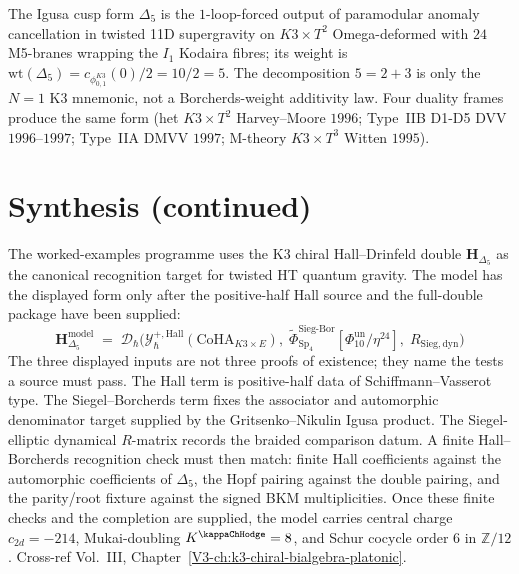 \begin{remark}
\label{rem:ex-delta5-1loop}
The Igusa cusp form $\Delta_5$ is the $1$-loop-forced output of paramodular anomaly
cancellation in twisted 11D supergravity on $K3 \times T^2$ Omega-deformed with $24$
M5-branes wrapping the $I_1$ Kodaira fibres; its weight is
$\mathrm{wt}(\Delta_5)=c_{\phi_{0,1}^{K3}}(0)/2=10/2=5$.
The decomposition $5=2+3$ is only the $N=1$ K3 mnemonic, not a
Borcherds-weight additivity law. Four duality frames produce the same form
(het $K3 \times T^2$ Harvey--Moore $1996$; Type~IIB D1-D5 DVV $1996$--$1997$; Type~IIA
DMVV $1997$; M-theory $K3 \times T^3$ Witten $1995$).
\end{remark}

\section{Synthesis (continued)}
\label{sec:ew-deep}

\begin{remark}
\label{rem:ew-deep-1}
The worked-examples programme uses the K3 chiral Hall--Drinfeld double
$\mathbf H_{\Delta_5}$ as the canonical recognition target for twisted
HT quantum gravity.  The model has the displayed form only after the
positive-half Hall source and the full-double package have been
supplied:
\[
\mathbf H_{\Delta_5}^{\mathrm{model}} \;=\; \mathcal D_\hbar\!\bigl(\mathcal Y^{+,\mathrm{Hall}}_\hbar(\mathrm{CoHA}_{K3\times E}),\;
\widetilde\Phi^{\mathrm{Sieg\text{-}Bor}}_{\mathrm{Sp}_4}[\Phi_{10}^{\mathrm{un}}/\eta^{24}],\;
R_{\mathrm{Sieg,dyn}}\bigr)
\]
The three displayed inputs are not three proofs of existence; they name
the tests a source must pass.  The Hall term is positive-half data of
Schiffmann--Vasserot type.  The Siegel--Borcherds term fixes the
associator and automorphic denominator target supplied by the
Gritsenko--Nikulin Igusa product.  The Siegel-elliptic dynamical
$R$-matrix records the braided comparison datum.  A finite
Hall--Borcherds recognition check must then match: finite Hall
coefficients against the automorphic coefficients of $\Delta_5$, the
Hopf pairing against the double pairing, and the parity/root fixture
against the signed BKM multiplicities.  Once these finite checks and
the completion are supplied, the model carries central charge
$c_{2d}=-214$, Mukai-doubling
$K^{\kappaChHodge}=8$, and Schur cocycle order $6$ in
$\mathbb Z/12$. Cross-ref Vol.~III,
Chapter~\ref{V3-ch:k3-chiral-bialgebra-platonic}.
\end{remark}

